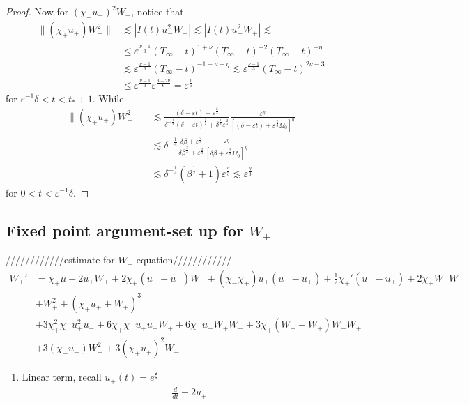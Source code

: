 \documentclass[letterpaper,11pt]{article}
\newcommand{\eps}{\varepsilon}
\newcommand{\lar}{ \lesssim }
\numberwithin{equation}{section}
\theoremstyle{plain}
\begin{document}
\begin{enumerate}
\begin{itemize}
\begin{enumerate}
\begin{proof}
Now for $(\chi_-u_-)^2W_+$, notice that
\begin{align*}
\|(\chi_+u_+)W_-^2\| &\lar |I(t)u_-^2W_+| \lar |I(t)u_+^2W_+| \lar \\
&\le \eps^{\frac{\nu-1}{3}}(T_\infty-t)^{1+\nu}(T_\infty-t)^{-2}(T_\infty-t)^{-\eta} \\
&\lar \eps^{\frac{\nu-1}{3}}(T_\infty-t)^{-1+\nu-\eta} \lar \eps^{\frac{\nu-1}{3}}(T_\infty-t)^{2\nu-3} \\
& \le \eps^{\frac{\nu-1}{3}}\eps^{\frac{3-2\nu}{6}} = \eps^{\frac{1}{6}}
\end{align*}
for $\eps^{-1}\delta < t<t_*+1$. While
\begin{align*}
\|(\chi_+u_+)W_-^2\| & \lar \frac{(\delta-\eps t)+\eps^{\frac{2}{3}}}{\delta^{-\frac{1}{4}}(\delta-\eps t)^{\frac{3}{2}} +\delta^{\frac{1}{4}}\eps^{\frac{2}{3}}} \frac{\eps^\eta}{\left[(\delta-\eps t)+\eps^{\frac{2}{3}}\Omega_0 \right]^{\eta}}\\
& \lar \delta^{-\frac{1}{4}}\frac{\delta \beta+\eps^{\frac{2}{3}}}{\delta \beta^{\frac{3}{2}}+\eps^{\frac{2}{3}}} \frac{\eps^{\eta}}{\left[\delta\beta+\eps^{\frac{2}{3}}\Omega_0\right]^\eta}\\
&\lar \delta^{-\frac{1}{4}} (\beta^{\frac{1}{2}}+1) \eps^{\frac{\eta}{3}} \lar \eps^{\frac{\eta}{3}}
\end{align*}
for $0<t<\eps^{-1}\delta$.
\end{proof}
\end{enumerate}


\pagebreak
\subsection{Fixed point argument-set up for $W_+$}
////////////estimate for $W_+$ equation////////////
\begin{align*}
W_+'  &=  \chi_+\mu+2u_+W_+ + 2\chi_+(u_+ -u_-)W_-+ (\chi_-\chi_+) u_+(u_- -u_+)+\frac{1}{2}\chi_+'(u_- -u_+) +2\chi_+W_-W_+\\
&+W_+^2+ (\chi_+u_+ + W_+)^3 \\
&+ 3\chi_+^2\chi_-u_+^2u_- + 6\chi_+\chi_- u_+u_- W_+ +6 \chi_+u_+W_+W_- +3\chi_+(W_-+W_+)W_-W_+\\
&+3(\chi_-u_-)W_+^2 + 3(\chi_+u_+)^2W_-
\end{align*}

\begin{enumerate}
\item Linear term, recall $u_+(t) = e^\xi$
\begin{align*}
\frac{d}{dt} - 2u_+
\end{align*}


\end{enumerate}
\end{itemize}
\end{enumerate}
\end{document}
